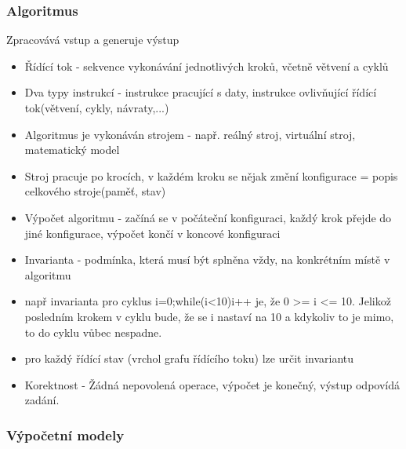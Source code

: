 \documentclass[10pt,a4paper]{article}
\begin{document}
\subsubsection{Algoritmus}
Zpracovává vstup a generuje výstup
\begin{itemize}
\item Řídící tok - sekvence vykonávání jednotlivých kroků, včetně větvení a cyklů
\item Dva typy instrukcí - instrukce pracující s daty, instrukce ovlivňující řídící tok(větvení, cykly, návraty,...)
\item Algoritmus je vykonáván strojem - např. reálný stroj, virtuální stroj, matematický model
\item Stroj pracuje po krocích, v každém kroku se nějak změní konfigurace = popis celkového stroje(paměť, stav)
\item Výpočet algoritmu - začíná se v počáteční konfiguraci, každý krok přejde do jiné konfigurace, výpočet končí v koncové konfiguraci
\item Invarianta - podmínka, která musí být splněna vždy, na konkrétním místě v algoritmu
\item např invarianta pro cyklus i=0;while(i<10){i++} je, že 0 >= i <= 10. Jelikož posledním krokem v cyklu bude, že se i nastaví na 10 a kdykoliv to je mimo, to do cyklu vůbec nespadne.
\item pro každý řídící stav (vrchol grafu řídícího toku) lze určit invariantu
\item Korektnost - Žádná nepovolená operace, výpočet je konečný, výstup odpovídá zadání.
\end{itemize}
\subsubsection{Výpočetní modely}
\end{document}

